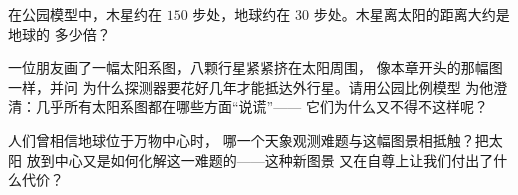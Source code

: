 \begin{exercise}[$\star$]\label{exo:g4:solar-system:9}
在公园模型中，木星约在 $150$ 步处，地球约在
$30$ 步处。木星离太阳的距离大约是地球的
多少倍？
\end{exercise}

\begin{exercise}[$\star\star$]\label{exo:g4:solar-system:10}
一位朋友画了一幅太阳系图，八颗行星紧紧挤在太阳周围，
像本章开头的那幅图一样，并问
为什么探测器要花好几年才能抵达外行星。请用公园比例模型
为他澄清：几乎所有太阳系图都在哪些方面“说谎”——
它们为什么又不得不这样呢？
\end{exercise}

\begin{exercise}[$\star\star$]\label{exo:g4:solar-system:11}
人们曾相信地球位于万物中心时，
哪一个天象观测难题与这幅图景相抵触？把太阳
放到中心又是如何化解这一难题的——这种新图景
又在自尊上让我们付出了什么代价？
\end{exercise}
